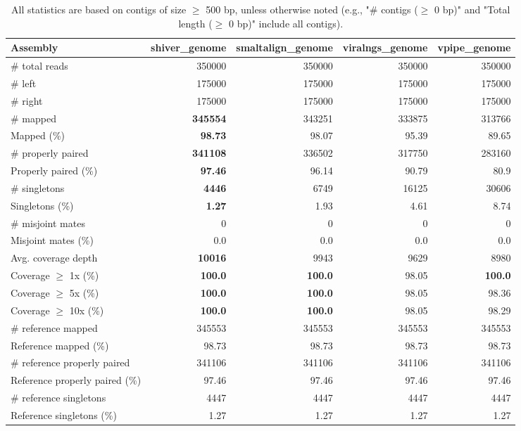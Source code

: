 \documentclass[12pt,a4paper]{article}
\begin{document}
\begin{table}[ht]
\begin{center}
\caption{All statistics are based on contigs of size $\geq$ 500 bp, unless otherwise noted (e.g., "\# contigs ($\geq$ 0 bp)" and "Total length ($\geq$ 0 bp)" include all contigs).}
\begin{tabular}{|l*{4}{|r}|}
\hline
Assembly & shiver\_genome & smaltalign\_genome & viralngs\_genome & vpipe\_genome \\ \hline
\# total reads & 350000 & 350000 & 350000 & 350000 \\ \hline
\# left & 175000 & 175000 & 175000 & 175000 \\ \hline
\# right & 175000 & 175000 & 175000 & 175000 \\ \hline
\# mapped & {\bf 345554} & 343251 & 333875 & 313766 \\ \hline
Mapped (\%) & {\bf 98.73} & 98.07 & 95.39 & 89.65 \\ \hline
\# properly paired & {\bf 341108} & 336502 & 317750 & 283160 \\ \hline
Properly paired (\%) & {\bf 97.46} & 96.14 & 90.79 & 80.9 \\ \hline
\# singletons & {\bf 4446} & 6749 & 16125 & 30606 \\ \hline
Singletons (\%) & {\bf 1.27} & 1.93 & 4.61 & 8.74 \\ \hline
\# misjoint mates & 0 & 0 & 0 & 0 \\ \hline
Misjoint mates (\%) & 0.0 & 0.0 & 0.0 & 0.0 \\ \hline
Avg. coverage depth & {\bf 10016} & 9943 & 9629 & 8980 \\ \hline
Coverage $\geq$ 1x (\%) & {\bf 100.0} & {\bf 100.0} & 98.05 & {\bf 100.0} \\ \hline
Coverage $\geq$ 5x (\%) & {\bf 100.0} & {\bf 100.0} & 98.05 & 98.36 \\ \hline
Coverage $\geq$ 10x (\%) & {\bf 100.0} & {\bf 100.0} & 98.05 & 98.29 \\ \hline
\# reference mapped & 345553 & 345553 & 345553 & 345553 \\ \hline
Reference mapped (\%) & 98.73 & 98.73 & 98.73 & 98.73 \\ \hline
\# reference properly paired & 341106 & 341106 & 341106 & 341106 \\ \hline
Reference properly paired (\%) & 97.46 & 97.46 & 97.46 & 97.46 \\ \hline
\# reference singletons & 4447 & 4447 & 4447 & 4447 \\ \hline
Reference singletons (\%) & 1.27 & 1.27 & 1.27 & 1.27 \\ \hline

\end{tabular}
\end{center}
\end{table}
\end{document}
